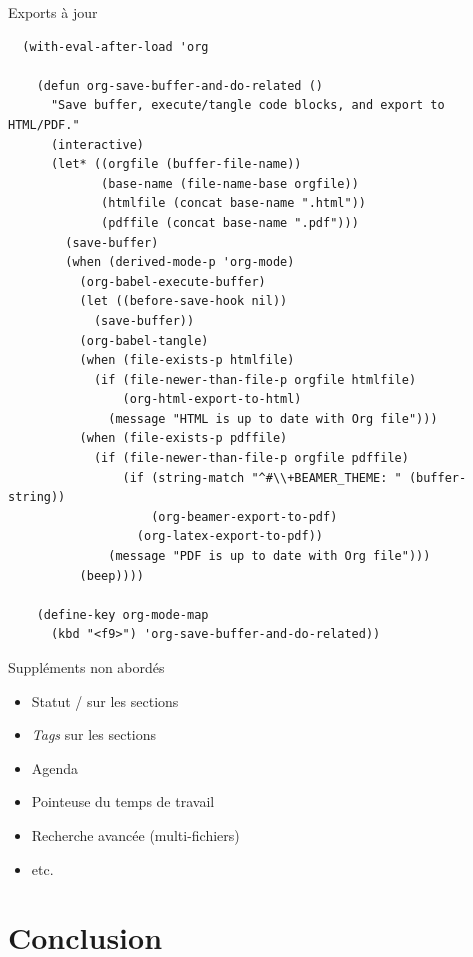 \documentclass[presentation,t]{beamer}
\let\ORIkeys\keys
\renewcommand{\keys}[1]{\ORIkeys{\texttt{#1}}}
\begin{document}
\begin{frame}[fragile,label={sec:orge8cc2bd}]{Exports à jour}
 \lstset{language=Lisp,label= ,caption= ,captionpos=b,numbers=none}
\begin{lstlisting}
  (with-eval-after-load 'org

    (defun org-save-buffer-and-do-related ()
      "Save buffer, execute/tangle code blocks, and export to HTML/PDF."
      (interactive)
      (let* ((orgfile (buffer-file-name))
             (base-name (file-name-base orgfile))
             (htmlfile (concat base-name ".html"))
             (pdffile (concat base-name ".pdf")))
        (save-buffer)
        (when (derived-mode-p 'org-mode)
          (org-babel-execute-buffer)
          (let ((before-save-hook nil))
            (save-buffer))
          (org-babel-tangle)
          (when (file-exists-p htmlfile)
            (if (file-newer-than-file-p orgfile htmlfile)
                (org-html-export-to-html)
              (message "HTML is up to date with Org file")))
          (when (file-exists-p pdffile)
            (if (file-newer-than-file-p orgfile pdffile)
                (if (string-match "^#\\+BEAMER_THEME: " (buffer-string))
                    (org-beamer-export-to-pdf)
                  (org-latex-export-to-pdf))
              (message "PDF is up to date with Org file")))
          (beep))))

    (define-key org-mode-map
      (kbd "<f9>") 'org-save-buffer-and-do-related))
\end{lstlisting}
\end{frame}

\begin{frame}[label={sec:org0aed99e}]{Suppléments non abordés}
\begin{itemize}
\item Statut \keys{TODO} / \keys{DONE} sur les sections
\item \emph{Tags} \keys{:noexport:} sur les sections
\item Agenda
\item Pointeuse du temps de travail
\item Recherche avancée (multi-fichiers)
\item etc.
\end{itemize}
\end{frame}

\section{Conclusion}
\label{sec:org8ac47b9}
\end{document}
